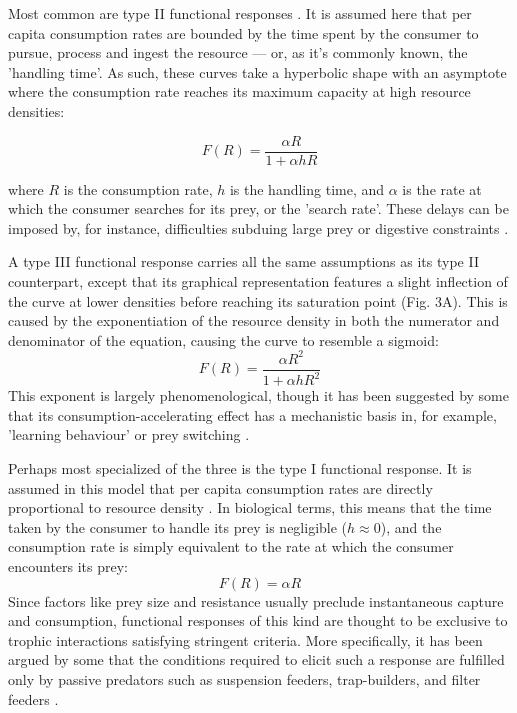 \documentclass[11pt]{article}
\begin{document}
    Most common are type II functional responses  \citep{hassell1976components, begon1996ecology,jeschke2004consumer}. It is assumed here that per capita consumption rates are bounded by the time spent by the consumer to pursue, process and ingest the resource — or, as it's commonly known, the 'handling time'. As such, these curves take a hyperbolic shape with an asymptote where the consumption rate reaches its maximum capacity at high resource densities:
    
    $$
        F(R) = \frac{\alpha R}{1+\alpha hR}     
    $$
    
    where $R$ is the consumption rate, $h$ is the handling time, and $\alpha$ is the rate at which the consumer searches for its prey, or the 'search rate'. These delays can be imposed by, for instance, difficulties subduing large prey \citep{holling1959b,jeschke2002predator,okuyama2015egg} or digestive constraints \citep{jeschke2002predator,van2004digestively}. 
    
    A type III functional response carries all the same assumptions as its type II counterpart, except that its graphical representation features a slight inflection of the curve at lower densities before reaching its saturation point (Fig. 3A). This is caused by the exponentiation of the resource density in both the numerator and denominator of the equation, causing the curve to resemble a sigmoid:
    $$
        F(R) = \frac{\alpha R^2}{1+\alpha hR^2}
    $$
    This exponent is largely phenomenological, though it has been suggested by some that its consumption-accelerating effect has a mechanistic basis in, for example, 'learning behaviour' \citep{real1977kinetics, holling1965functional} or prey switching \citep{murdoch1977stabilizing}.
    
    Perhaps most specialized of the three is the type I functional response. It is assumed in this model that per capita consumption rates are directly proportional to resource density \citep{holling1959a}. In biological terms, this means that the time taken by the consumer to handle its prey is negligible ($h\approx0$), and the consumption rate is simply equivalent to the rate at which the consumer encounters its prey:
    $$
        F(R) = \alpha R
    $$
    Since factors like prey size and resistance usually preclude instantaneous capture and consumption, functional responses of this kind are thought to be exclusive to trophic interactions satisfying stringent criteria. More specifically, it has been argued by some that the conditions required to elicit such a response are fulfilled only by passive predators such as suspension feeders, trap-builders, and filter feeders \citep{jeschke2004consumer}.
    
\end{document}
